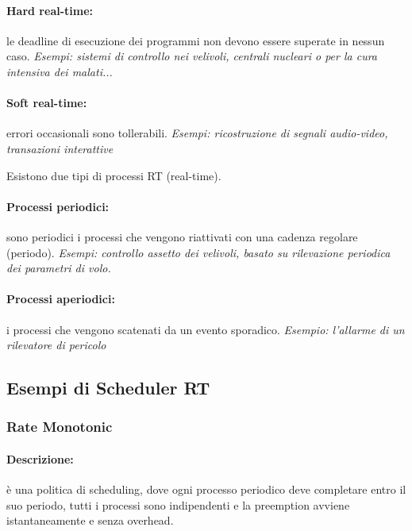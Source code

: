 \paragraph{Hard real-time:} le deadline di esecuzione dei programmi non devono essere superate in nessun caso.
\newline
\textit{Esempi: sistemi di controllo nei velivoli, centrali nucleari o per la cura intensiva dei malati...}

\paragraph{Soft real-time:} errori occasionali sono tollerabili.
\newline
\textit{Esempi: ricostruzione di segnali audio-video, transazioni interattive}
\newline

Esistono due tipi di processi RT (real-time).

\paragraph{Processi periodici:} sono periodici i processi che vengono riattivati con una cadenza regolare (periodo).
\newline
\textit{Esempi: controllo assetto dei velivoli, basato su rilevazione periodica dei parametri di volo.}

\paragraph{Processi aperiodici:} i processi che vengono scatenati da un evento sporadico.
\newline
\textit{Esempio: l'allarme di un rilevatore di pericolo}

\subsection{Esempi di Scheduler RT}
\subsubsection{Rate Monotonic}
\paragraph{Descrizione:} è una politica di scheduling, dove ogni processo periodico deve completare entro il suo periodo, tutti i processi sono indipendenti e la preemption avviene istantaneamente e senza overhead.

